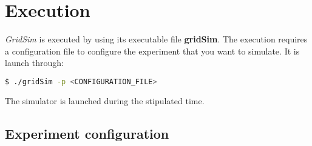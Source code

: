 \chapter{Execution}
\label{chap:Execution}

{\it GridSim} is executed by using its executable file {\bf gridSim}.
The execution requires a configuration file to configure the experiment that you want to simulate.
It is launch through:
\begin{lstlisting}[language=bash]
  $ ./gridSim -p <CONFIGURATION_FILE>
\end{lstlisting}
\noindent
The simulator is launched during the stipulated time.

%
\section{Experiment configuration}













